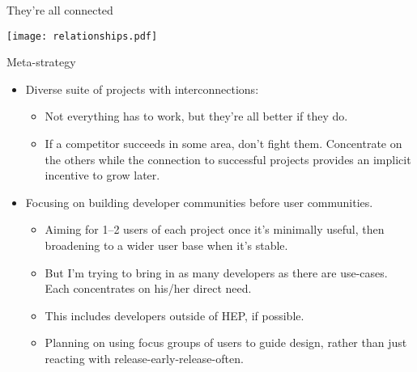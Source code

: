 \begin{frame}{They're all connected}
\begin{center}
\texttt{[image: relationships.pdf]}
\end{center}
\end{frame}

\begin{frame}{Meta-strategy}
\vspace{0.25 cm}
\begin{itemize}
\item Diverse suite of projects with interconnections:
\begin{itemize}
\item Not everything has to work, but they're all better if they do.
\item If a competitor succeeds in some area, don't fight them. Concentrate on the others while the connection to successful projects provides an implicit incentive to grow later.
\end{itemize}

\item Focusing on building developer communities before user communities.
\begin{itemize}
\item Aiming for 1--2 users of each project once it's minimally useful, then broadening to a wider user base when it's stable.
\item But I'm trying to bring in as many developers as there are use-cases. Each concentrates on his/her direct need.
\item This includes developers outside of HEP, if possible.
\item Planning on using focus groups of users to guide design, rather than just reacting with release-early-release-often.
\end{itemize}
\end{itemize}
\end{frame}

